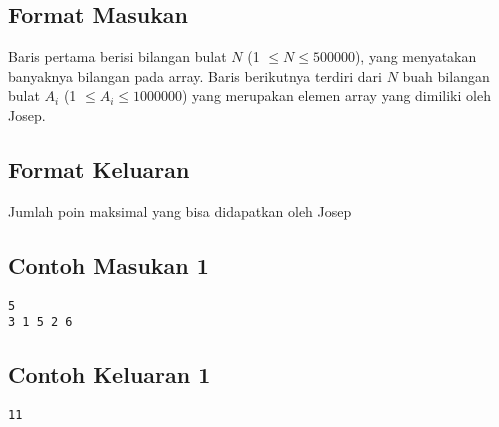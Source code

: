 \documentclass{article}
\begin{document}


\subsection*{Format Masukan}


Baris pertama berisi bilangan bulat $N$ (1 $\leq N \leq 500000$), yang menyatakan banyaknya bilangan pada array.
Baris berikutnya terdiri dari $N$ buah bilangan bulat $A_i$ (1 $\leq A_i \leq 1000000$) yang merupakan elemen array yang dimiliki oleh Josep.

\subsection*{Format Keluaran}
Jumlah poin maksimal yang bisa didapatkan oleh Josep
\\

\begin{multicols}{2}
\subsection*{Contoh Masukan 1}
\begin{lstlisting}
5
3 1 5 2 6
\end{lstlisting}
\columnbreak
\subsection*{Contoh Keluaran 1}
\begin{lstlisting}
11
\end{lstlisting}
\vfill
\end{multicols}
\end{document}
